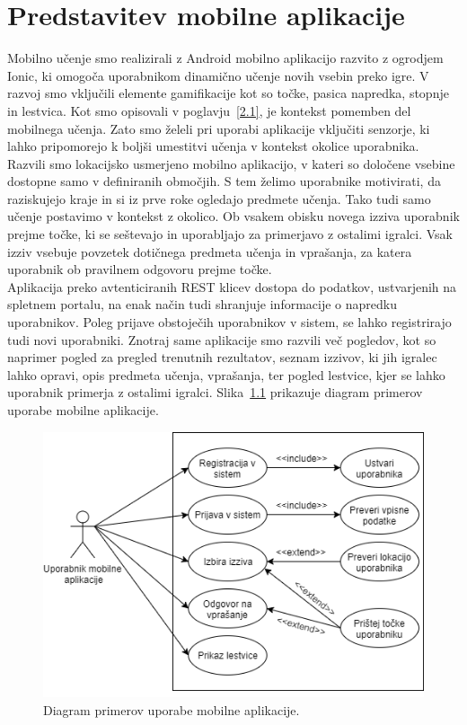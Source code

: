 \documentclass[a4paper, 12pt]{book}
\begin{document}
\chapter{Predstavitev mobilne aplikacije}
\label{ch7}
Mobilno učenje smo realizirali z Android mobilno aplikacijo razvito z ogrodjem Ionic, ki omogoča uporabnikom dinamično učenje novih vsebin preko igre. V razvoj smo vključili elemente gamifikacije kot so točke, pasica napredka, stopnje in lestvica. Kot smo opisovali v poglavju~\ref{2.1}, je kontekst pomemben del mobilnega učenja. Zato smo želeli pri uporabi aplikacije vključiti senzorje, ki lahko pripomorejo k boljši umestitvi učenja v kontekst okolice uporabnika. Razvili smo lokacijsko usmerjeno mobilno aplikacijo, v kateri so določene vsebine dostopne samo v definiranih območjih. S tem želimo uporabnike motivirati, da raziskujejo kraje in si iz prve roke ogledajo predmete učenja. Tako tudi samo učenje postavimo v kontekst z okolico. Ob vsakem obisku novega izziva uporabnik prejme točke, ki se seštevajo in uporabljajo za primerjavo z ostalimi igralci. Vsak izziv vsebuje povzetek dotičnega predmeta učenja in vprašanja, za katera uporabnik ob pravilnem odgovoru prejme točke.\\Aplikacija preko avtenticiranih REST klicev dostopa do podatkov, ustvarjenih na spletnem portalu, na enak način tudi shranjuje informacije o napredku uporabnikov. Poleg prijave obstoječih uporabnikov v sistem, se lahko registrirajo tudi novi uporabniki.
\newpage
\noindent Znotraj same aplikacije smo razvili več pogledov, kot so naprimer pogled za pregled trenutnih rezultatov, seznam izzivov, ki jih igralec lahko opravi, opis predmeta učenja, vprašanja, ter pogled lestvice, kjer se lahko uporabnik primerja z ostalimi igralci. Slika~\ref{UML-mobilna} prikazuje diagram primerov uporabe mobilne aplikacije.
\begin{figure}[H]
\centering
\includegraphics[height=0.65\textwidth]{slike/UML-mobilna}
\caption{Diagram primerov uporabe mobilne aplikacije. }\label{UML-mobilna}
\end{figure}
\end{document}
